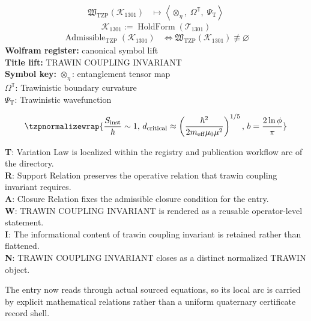 \noindent
\begin{minipage}[t]{0.48\linewidth}
\begingroup
\small
\[
\begin{aligned}
\mathfrak{W}_{\mathrm{TZP}}\!\left(\mathcal{K}_{1301}\right)
&\longmapsto
\left\langle \otimes_{\eta},\; \Omega^{\mathbb{T}},\; \Psi_{\mathrm{T}} \right\rangle
\end{aligned}
\]
\[
\mathcal{K}_{1301}
:=
\operatorname{HoldForm}\!\left(\mathcal{T}_{1301}\right)
\]
\[
\begin{aligned}
\operatorname{Admissible}_{\mathrm{TZP}}\!\left(\mathcal{K}_{1301}\right)
&\Longleftrightarrow
\mathfrak{W}_{\mathrm{TZP}}\!\left(\mathcal{K}_{1301}\right)\not\equiv\varnothing
\end{aligned}
\]
\textbf{Wolfram register:} canonical symbol lift\\
\textbf{Title lift:} TRAWIN COUPLING INVARIANT\\
\textbf{Symbol key:} \(\otimes_{\eta}\): entanglement tensor map\\ \(\Omega^{\mathbb{T}}\): Trawinistic boundary curvature\\ \(\Psi_{\mathrm{T}}\): Trawinistic wavefunction
\par
\endgroup
\end{minipage}\hfill
\begin{minipage}[t]{0.48\linewidth}
\[
\tzpnormalizewrap{\frac{S_{\mathrm{inst}}}{\hbar}\sim 1,\,d_{\mathrm{critical}}\approx\left(\frac{\hbar^2}{2m_{\mathrm{eff}}\mu_0\mu^2}\right)^{1/5},\,b=\frac{2\ln\phi}{\pi}}
\]

\small
\textbf{T}: Variation Law is localized within the registry and publication workflow arc of the directory.\\
\textbf{R}: Support Relation preserves the operative relation that trawin coupling invariant requires.\\
\textbf{A}: Closure Relation fixes the admissible closure condition for the entry.\\
\textbf{W}: TRAWIN COUPLING INVARIANT is rendered as a reusable operator-level statement.\\
\textbf{I}: The informational content of trawin coupling invariant is retained rather than flattened.\\
\textbf{N}: TRAWIN COUPLING INVARIANT closes as a distinct normalized TRAWIN object.
\normalsize
\end{minipage}

The entry now reads through actual sourced equations, so its local arc is carried by explicit mathematical relations rather than a uniform quaternary certificate record shell.
\clearpage

